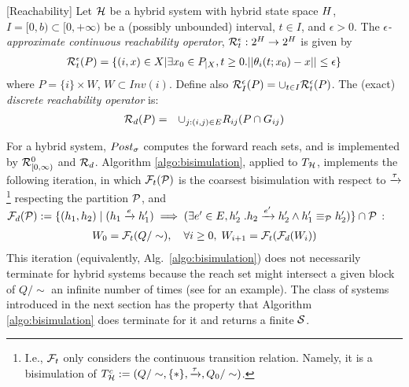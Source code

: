 \begin{defn}
	\label{defn:reachability operators}[Reachability]
	Let $\mathcal{H}$ be a hybrid system with hybrid state space $H$, 	 
	$I = [0,b) \subset [0,+\infty)$ be a (possibly unbounded) interval, 
	$t \in I$, 
	and $\epsilon >0$.
	The \emph{$\epsilon$-approximate continuous reachability operator}, 
	$\mathcal{R}^{\epsilon}_t : 2^H \rightarrow 2^H$ is given by
	\begin{eqnarray*}
		\mathcal{R}^{\epsilon}_t(P) = \{(i,x) \in X | \exists x_0 \in P_{|X}, t \geq 0. 
		||\theta_i(t;x_0) - x|| \leq \epsilon\} 
	\end{eqnarray*}
	where $P = \{i\}\times W$, $W \subset Inv(i)$.
	Define also $\mathcal{R}^{\epsilon}_I(P) = \cup_{t\in I} \mathcal{R}^{\epsilon}_t(P)$.
	The (exact) \emph{discrete reachability operator} is:
	\begin{eqnarray*}
	\mathcal{R}_{d}(P) &=& \cup_{j: (i,j) \in E} R_{ij}(P \cap G_{ij})
	\end{eqnarray*}
\end{defn}
%
For a hybrid system, $Post_\sigma$ computes the forward reach sets, and is implemented by $\mathcal{R}^0_{[0,\infty)}$ and $\mathcal{R}_d$. 
Algorithm \ref{algo:bisimulation}, applied to $T_{\mathcal{H}}$, implements the following iteration, 
in which 
$\mathcal{F}_t(\mathcal{P})$ is the coarsest bisimulation with respect to $\xrightarrow{\tau}$\footnote{I.e., $\mathcal{F}_t$ only considers the continuous transition relation. Namely, it is a bisimulation of $T_{\mathcal{H}}^c := (Q/\sim,\{*\},\xrightarrow{\tau},Q_0/\sim)$.} 
respecting the partition $\mathcal{P}$, 
and 
$\mathcal{F}_d(\mathcal{P}) := \{(h_1,h_2)  \;|\; (h_1 \xrightarrow{e} h_1') \implies (\exists e' \in E, h_2' \; . h_2 \xrightarrow{e'} h_2' \land h_1' \equiv_{\mathcal{P}} h_2') \} \cap \mathcal{P}$ \cite{VladimerouPVD08_STORMED}:
\begin{eqnarray}
W_0 = \mathcal{F}_t(Q/\sim), \quad\forall i\geq 0,\; W_{i+1} = \mathcal{F}_t(\mathcal{F}_d(W_i))
\end{eqnarray}
This iteration (equivalently, Alg.~\ref{algo:bisimulation}) does not necessarily terminate for hybrid systems because the reach set might intersect a given block of $Q/\sim$ an infinite number of times (see \cite{LaFerrierePS00_Ominimal} for an example).
The class of systems introduced in the next section has the property that Algorithm \ref{algo:bisimulation} does terminate for it and returns a finite $\mathcal{S}$.

